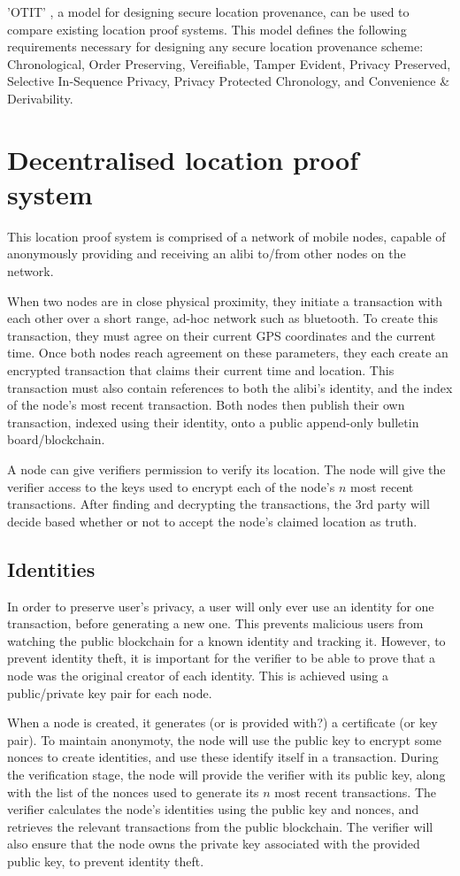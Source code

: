 \documentclass[12pt]{article}
\begin{document}
'OTIT' \cite{otit}, a model for designing secure location provenance, can be used to compare existing location proof systems. This model defines the following requirements necessary for designing any secure location provenance scheme: Chronological, Order Preserving, Vereifiable, Tamper Evident, Privacy Preserved, Selective In-Sequence Privacy, Privacy Protected Chronology, and Convenience \& Derivability.

\section{Decentralised location proof system}
This location proof system is comprised of a network of mobile nodes, capable of anonymously providing and receiving an alibi to/from other nodes on the network.

When two nodes are in close physical proximity, they initiate a transaction with each other over a short range, ad-hoc network such as bluetooth. To create this transaction, they must agree on their current GPS coordinates and the current time. Once both nodes reach agreement on these parameters, they each create an encrypted transaction that claims their current time and location. This transaction must also contain references to both the alibi's identity, and the index of the node’s most recent transaction. Both nodes then publish their own transaction, indexed using their identity, onto a public append-only bulletin board/blockchain.

A node can give verifiers permission to verify its location. The node will give the verifier access to the keys used to encrypt each of the node’s $n$ most recent transactions. After finding and decrypting the transactions, the 3rd party will decide based whether or not to accept the node's claimed location as truth.

\subsection{Identities}
In order to preserve user's privacy, a user will only ever use an identity for one transaction, before generating a new one. This prevents malicious users from watching the public blockchain for a known identity and tracking it. However, to prevent identity theft, it is important for the verifier to be able to prove that a node was the original creator of each identity. This is achieved using a public/private key pair for each node.

When a node is created, it generates (or is provided with?) a certificate (or key pair). To maintain anonymoty, the node will use the public key to encrypt some nonces to create identities, and use these identify itself in a transaction. During the verification stage, the node will provide the verifier with its public key, along with the list of the nonces used to generate its $n$ most recent transactions. The verifier calculates the node's identities using the public key and nonces, and retrieves the relevant transactions from the public blockchain. The verifier will also ensure that the node owns the private key associated with the provided public key, to prevent identity theft.
\end{document}
